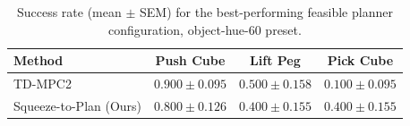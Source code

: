 \begin{table}[t]
\centering
\begin{tabular}{lccc}
\toprule
Method & Push Cube & Lift Peg & Pick Cube \\
\midrule
TD-MPC2 & $0.900 \pm 0.095$ & $0.500 \pm 0.158$ & $0.100 \pm 0.095$ \\
Squeeze-to-Plan (Ours) & $0.800 \pm 0.126$ & $0.400 \pm 0.155$ & $0.400 \pm 0.155$ \\
\bottomrule
\end{tabular}
\caption{Success rate (mean $\pm$ SEM) for the best-performing feasible planner configuration, object-hue-60 preset.}
\label{tab:latency_vs_success_rate_object-hue-60}
\end{table}
